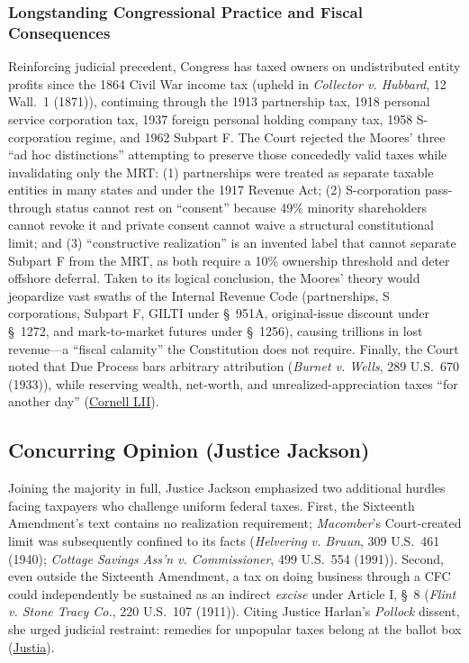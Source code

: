 \documentclass[12pt]{article}
\begin{document}
\subsubsection{Longstanding Congressional Practice and Fiscal Consequences}

Reinforcing judicial precedent, Congress has taxed owners on undistributed entity profits since the 1864 Civil War income tax (upheld in \textit{Collector v. Hubbard}, 12 Wall.\ 1 (1871)), continuing through the 1913 partnership tax, 1918 personal service corporation tax, 1937 foreign personal holding company tax, 1958 S-corporation regime, and 1962 Subpart F. The Court rejected the Moores' three ``ad hoc distinctions'' attempting to preserve those concededly valid taxes while invalidating only the MRT: (1) partnerships were treated as separate taxable entities in many states and under the 1917 Revenue Act; (2) S-corporation pass-through status cannot rest on ``consent'' because 49\% minority shareholders cannot revoke it and private consent cannot waive a structural constitutional limit; and (3) ``constructive realization'' is an invented label that cannot separate Subpart F from the MRT, as both require a 10\% ownership threshold and deter offshore deferral. Taken to its logical conclusion, the Moores' theory would jeopardize vast swaths of the Internal Revenue Code (partnerships, S corporations, Subpart F, GILTI under \S\ 951A, original-issue discount under \S\ 1272, and mark-to-market futures under \S\ 1256), causing trillions in lost revenue---a ``fiscal calamity'' the Constitution does not require. Finally, the Court noted that Due Process bars arbitrary attribution (\textit{Burnet v. Wells}, 289 U.S.\ 670 (1933)), while reserving wealth, net-worth, and unrealized-appreciation taxes ``for another day'' (\href{https://www.law.cornell.edu/supremecourt/text/22-800_2024-06-20}{Cornell LII}).

\subsection{Concurring Opinion (Justice Jackson)}

Joining the majority in full, Justice Jackson emphasized two additional hurdles facing taxpayers who challenge uniform federal taxes. First, the Sixteenth Amendment's text contains no realization requirement; \textit{Macomber}'s Court-created limit was subsequently confined to its facts (\textit{Helvering v. Bruun}, 309 U.S.\ 461 (1940); \textit{Cottage Savings Ass'n v. Commissioner}, 499 U.S.\ 554 (1991)). Second, even outside the Sixteenth Amendment, a tax on doing business through a CFC could independently be sustained as an indirect \textit{excise} under Article I, \S\ 8 (\textit{Flint v. Stone Tracy Co.}, 220 U.S.\ 107 (1911)). Citing Justice Harlan's \textit{Pollock} dissent, she urged judicial restraint: remedies for unpopular taxes belong at the ballot box (\href{https://supreme.justia.com/cases/federal/us/602/22-800/}{Justia}).
\end{document}

